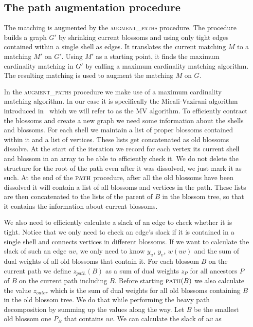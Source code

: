\subsection{The path augmentation procedure}

The matching is augmented by the \textsc{augment\_paths} procedure. The procedure builds a graph $G'$ by shrinking current blossoms and using only tight edges contained within a single shell as edges. It translates the current matching $M$ to a matching $M'$ on $G'$. Using $M'$ as a starting point, it finds the maximum cardinality matching in $G'$ by calling a maximum cardinality matching algorithm. The resulting matching is used to augment the matching $M$ on $G$.

In the \textsc{augment\_paths} procedure we make use of a maximum cardinality matching algorithm. In our case it is specifically the Micali-Vazirani algorithm introduced in~\cite{micali1980v} which we will refer to as the MV algorithm. To efficiently contract the blossoms and create a new graph we need some information about the shells and blossoms. For each shell we maintain a list of proper blossoms contained within it and a list of vertices. These lists get concatenated as old blossoms dissolve. At the start of the iteration we record for each vertex its current shell and blossom in an array to be able to efficiently check it. We do not delete the structure for the root of the path even after it was dissolved, we just mark it as such. At the end of the $\textsc{path}$ procedure, after all the old blossoms have been dissolved it will contain a list of all blossoms and vertices in the path. These lists are then concatenated to the lists of the parent of $B$ in the blossom tree, so that it contains the information about current blossoms.

We also need to efficiently calculate a slack of an edge to check whether it is tight. Notice that we only need to check an edge's slack if it is contained in a single shell and connects vertices in different blossoms. If we want to calculate the slack of such an edge $uv$, we only need to know $y_u$, $y_v$, $w(uv)$ and the sum of dual weights of all old blossoms that contain it. For each blossom $B$ on the current path we define $z_{path}(B)$ as a sum of dual weights $z_P$ for all ancestors $P$ of $B$ on the current path including $B$. Before starting $\textsc{path}(B)$ we also calculate the value $z_{outer}$ which is the sum of dual weights for all old blossoms containing $B$ in the old blossom tree. We do that while performing the heavy path decomposition by summing up the values along the way. Let $B$ be the smallest old blossom one $P_B$ that contains $uv$. We can calculate the slack of $uv$ as

